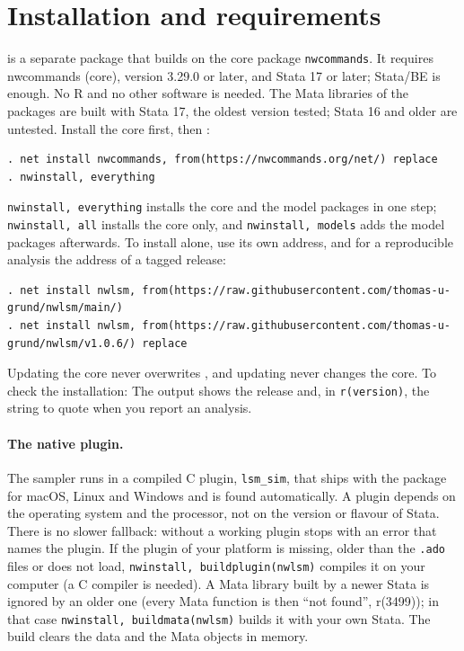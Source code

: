\section{Installation and requirements}\label{sec:install}

\nwlsm{} is a separate package that builds on the core package \texttt{nwcommands}. It requires nwcommands (core), version 3.29.0 or later, and Stata 17 or later; Stata/BE is enough. No R and no other software is needed. The Mata libraries of the packages are built with Stata 17, the oldest version tested; Stata 16 and older are untested. Install the core first, then \nwlsm{}:

\begin{lstlisting}
. net install nwcommands, from(https://nwcommands.org/net/) replace
. nwinstall, everything
\end{lstlisting}

\texttt{nwinstall, everything} installs the core and the model packages in one step; \texttt{nwinstall, all} installs the core only, and \texttt{nwinstall, models} adds the model packages afterwards. To install \nwlsm{} alone, use its own address, and for a reproducible analysis the address of a tagged release:

\begin{lstlisting}
. net install nwlsm, from(https://raw.githubusercontent.com/thomas-u-grund/nwlsm/main/)
. net install nwlsm, from(https://raw.githubusercontent.com/thomas-u-grund/nwlsm/v1.0.6/) replace
\end{lstlisting}

Updating the core never overwrites \nwlsm{}, and updating \nwlsm{} never changes the core. To check the installation:
The output shows the release and, in \texttt{r(version)}, the string to quote when you report an analysis.

\paragraph{The native plugin.} The sampler runs in a compiled C plugin, \texttt{lsm\_sim}, that ships with the package for macOS, Linux and Windows and is found automatically. A plugin depends on the operating system and the processor, not on the version or flavour of Stata. There is no slower fallback: without a working plugin \nwlsm{} stops with an error that names the plugin. If the plugin of your platform is missing, older than the \texttt{.ado} files or does not load, \texttt{nwinstall, buildplugin(nwlsm)} compiles it on your computer (a C compiler is needed). A Mata library built by a newer Stata is ignored by an older one (every Mata function is then ``not found'', r(3499)); in that case \texttt{nwinstall, buildmata(nwlsm)} builds it with your own Stata. The build clears the data and the Mata objects in memory.

